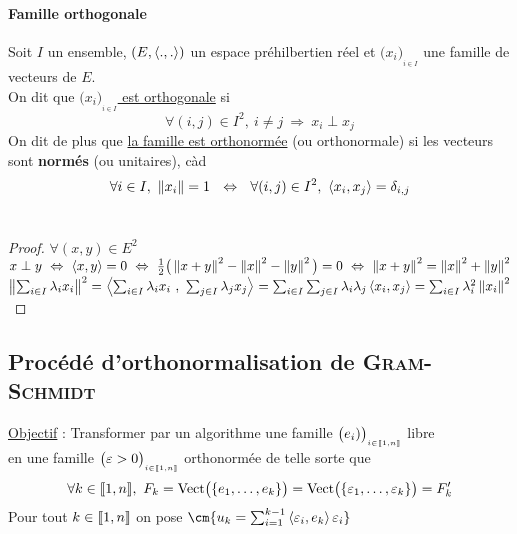 		\paragraph{Famille orthogonale}
			Soit $I$ un ensemble, $(E,\left< .,. \right>)$ un espace préhilbertien réel et $\big(x_i\big)_{_{i\in I}}$ une famille de vecteurs de $E$.\\
			On dit que \uline{$\big(x_i\big)_{_{i\in I}}$ est orthogonale} si 
			\[ \forall (i,j)\in I^2,~i\neq j ~\Rightarrow~x_i\perp x_j \]
			On dit de plus que \uline{la famille est orthonormée} (ou orthonormale) si les vecteurs sont \textbf{normés} (ou unitaires), càd 
			\[ \forall i\in I ,~ \left\Vert x_i \right\Vert = 1 ~~\Leftrightarrow ~~\forall (i,j)\in I^2 ,~\left< x_i,x_j \right> = \delta_{i,j} \] \trait
		\vspace*{0.5cm} \\ 
		\begin{proof}
		$\forall (x,y)\in E^2$\\
		\un $x\perp y ~\Leftrightarrow ~\left< x,y \right> = 0 ~\Leftrightarrow~ \frac{1}{2}\big( \left\Vert x+y \right\Vert^2 - \left\Vert x \right\Vert^2 - \left\Vert y \right\Vert^2 \big)=0 ~\Leftrightarrow~\left\Vert x+y \right\Vert^2 = \left\Vert x \right\Vert^2 + \left\Vert y \right\Vert^2$\\
		\deux $\left\Vert \sum_{i\in I} \lambda_ix_i \right\Vert^2 = \left< \sum_{i\in I}\lambda_ix_i ~,~\sum_{j\in I} \lambda_jx_j \right> = \sum_{i\in I}\sum_{j\in I}\lambda_i\lambda_j \left< x_i,x_j \right> = \sum_{i\in I} \lambda_i^2 \left\Vert x_i \right\Vert^2$
		\end{proof}
	\subsection{Procédé d'orthonormalisation de \textsc{Gram-Schmidt}}
		\uline{Objectif} : Transformer par un algorithme une famille $\big(e_i)\big)_{_{i\in{\llbracket 1,n \rrbracket}}}$ libre \\en une famille $\big( \varepsilon>0 \big)_{_{i\in{\llbracket 1,n \rrbracket}}}$ orthonormée de telle sorte que \[ \forall k\in {\llbracket 1,n \rrbracket} ,~F_k = \mathrm{Vect}\big(\{e_1,\dots ,e_k\} \big) = \mathrm{Vect}\big( \{\varepsilon_1,\dots ,\varepsilon_k\} \big ) = F_k'\]
		${}$ \\ Pour tout $k\in {\llbracket 1,n \rrbracket}$ on pose $\cm{u_k = \si{1}{k-1} \scal{\varepsilon_i , e_k} \varepsilon_i }$
